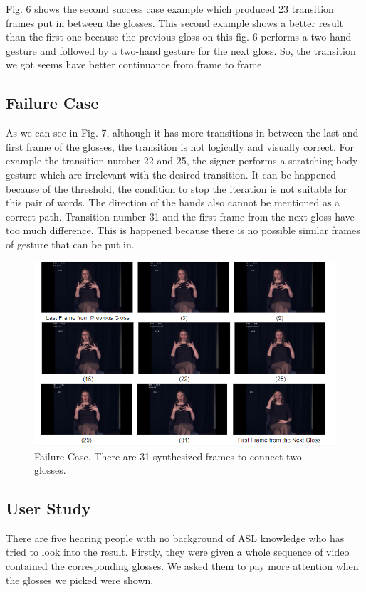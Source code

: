 \documentclass{sig-alternate-05-2015}
\begin{document}
Fig. 6 shows the second success case example which produced 23 transition frames put in between the glosses. This second example shows a better result than the first one because the previous gloss on this fig. 6 performs a two-hand gesture and followed by a two-hand gesture for the next gloss. So, the transition we got seems have better continuance from frame to frame.

\subsection{Failure Case}
As we can see in Fig. 7, although it has more transitions in-between the last and first frame of the glosses, the transition is not logically and visually correct. For example the transition number 22 and 25, the signer performs a scratching body gesture which are irrelevant with the desired transition. It can be happened because of the threshold, the condition to stop the iteration is not suitable for this pair of words. The direction of the hands also cannot be mentioned as a correct path. Transition number 31 and the first frame from the next gloss have too much difference. This is happened because there is no possible similar frames of gesture that can be put in.

\begin{figure}
	\centering
	\includegraphics[width=\linewidth]{img/failure.png}
	\caption{Failure Case. There are 31 synthesized frames to connect two glosses.}
\end{figure}

\subsection{User Study}
There are five hearing people with no background of ASL knowledge who has tried to look into the result. Firstly, they were given a whole sequence of video contained the corresponding glosses. We asked them to pay more attention when the glosses we picked were shown.
\end{document}

